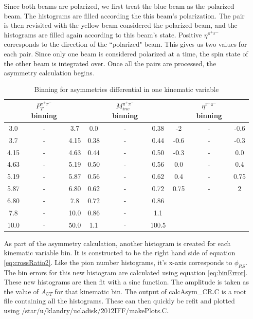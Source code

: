 \documentclass[letterpaper, abstract = on,listof=totoc, bibliography=totoc]{scrreprt}
\newcommand{\phirs}{\phi_{RS}}
\newcommand{\ptpair}{P_{T}^{\pi^+\pi^-}}
\newcommand{\mpair}{M_{inv}^{\pi^+\pi^-}}
\newcommand{\etapair}{\eta^{\pi^+\pi^-}}
\begin{document}
Since both beams are polarized, we first treat the blue beam as the polarized beam. The histograms are filled according the this beam's polarization. The pair is then revisited with the yellow beam considered the polarized beam, and the histograms are filled again according to this beam's state. Positive $\etapair$ corresponds to the direction of the ``polarized" beam. This gives us two values for each pair. Since only one beam is considered polarized at a time, the spin state of the other beam is integrated over. Once all the pairs are processed, the asymmetry calculation begins. 
\begin{center}
\begin{table}[h!]
\caption{Binning for asymmetries differential in one kinematic variable}
\small
\begin{tabular}{c c c|c c c|c c c} 
\\
 & $\ptpair$ binning &  & & $\mpair$ binning & & & $\etapair$ binning &	\\ \hline
3.0 & - & 3.7	& 0.0 & - & 0.38&-2 & - & -0.6\\
3.7 & - & 4.15	&0.38 & - & 0.44&-0.6 & - & -0.3\\
4.15 & - & 4.63 &0.44 & - & 0.50	&-0.3 & - & 0.0	\\
4.63 & - & 5.19&0.50 & - & 0.56&0.0 & - & 0.4\\
5.19 & - & 5.87&0.56 & - & 0.62&0.4 & - & 0.75\\
5.87 & - & 6.80&0.62 & - & 0.72&0.75 & - &2\\
6.80 & - &7.8&0.72 & - & 0.86&\\
7.8 & - & 10.0&0.86 & - & 1.1&\\
10.0 & - & 50.0&1.1 & - & 100.5&\\
\end{tabular}
\label{tab:1dbinning}
\end{table}
\end{center}

As part of the asymmetry calculation, another histogram is created for each kinematic variable bin. It is constructed to be the right hand side of equation \ref{eq:crossRatio2}. Like the pion number histograms, it's x-axis corresponds to $\phirs$. The bin errors for this new histogram are calculated using equation \ref{eq:binError}. These new histograms are then fit with a sine function. The amplitude is taken as the value of $A_{UT}$ for that kinematic bin. The output of calcAsym\_CR.C is a root file containing all the histograms. These can then quickly be refit and plotted using /star/u/klandry/ucladisk/2012IFF/makePlots.C.
\end{document}
